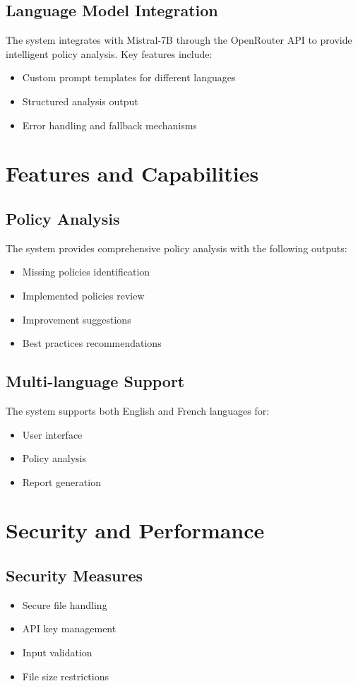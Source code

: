 \documentclass[11pt,a4paper]{article}
\begin{document}
\subsection{Language Model Integration}
The system integrates with Mistral-7B through the OpenRouter API to provide intelligent policy analysis. Key features include:
\begin{itemize}
    \item Custom prompt templates for different languages
    \item Structured analysis output
    \item Error handling and fallback mechanisms
\end{itemize}

\section{Features and Capabilities}
\subsection{Policy Analysis}
The system provides comprehensive policy analysis with the following outputs:
\begin{itemize}
    \item Missing policies identification
    \item Implemented policies review
    \item Improvement suggestions
    \item Best practices recommendations
\end{itemize}

\subsection{Multi-language Support}
The system supports both English and French languages for:
\begin{itemize}
    \item User interface
    \item Policy analysis
    \item Report generation
\end{itemize}

\section{Security and Performance}
\subsection{Security Measures}
\begin{itemize}
    \item Secure file handling
    \item API key management
    \item Input validation
    \item File size restrictions
\end{itemize}
\end{document}
